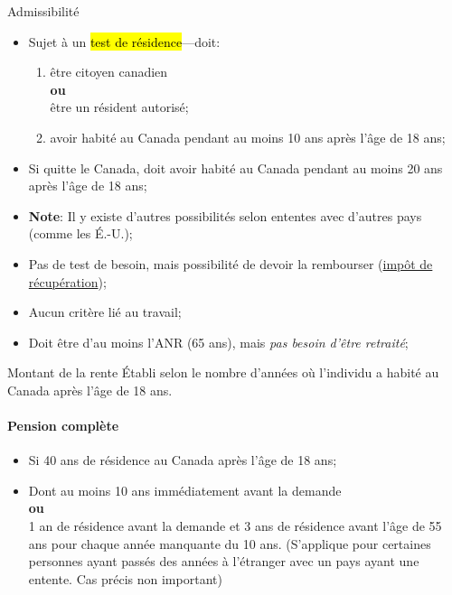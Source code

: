 \documentclass[10pt, french]{article}
\begin{document}
\begin{multicols*}{3}
\begin{conceptgen}{Admissibilité}
\begin{itemize}[leftmargin = *]
	\item	Sujet à un \hl{test de résidence}---doit: 
		\begin{enumerate}[leftmargin = *]
		\item	être citoyen canadien \\
					\textbf{ou}\\
				être un résident autorisé;
		\item	avoir habité au Canada pendant au moins 10 ans après l'âge de 18 ans;
		\end{enumerate}
	\item	Si quitte le Canada, doit avoir habité au Canada pendant au moins 20 ans après l'âge de 18 ans;
	\item[]	\textbf{Note}: Il y existe d'autres possibilités selon ententes avec d'autres pays (comme les É.-U.);
	\item	Pas de test de besoin, mais possibilité de devoir la rembourser (\hypertarget{recup_tx_l8r1}{\hyperlink{recup_tx_explain}{\textcolor{blue_rectangle}{impôt de récupération}}});
	\item   Aucun critère lié au travail;
	\item	Doit être d'au moins l'ANR (65 ans), mais \textit{pas besoin d'être retraité};
\end{itemize}
\end{conceptgen}

\begin{conceptgen}{Montant de la rente}
Établi selon le nombre d'années où l'individu a habité au Canada après l'âge de 18 ans.

\paragraph*{Pension complète}
\begin{itemize}[leftmargin = *]
	\item	Si 40 ans de résidence au Canada après l'âge de 18 ans;
	\item	Dont au moins 10 ans immédiatement avant la demande \\
				\textbf{ou} 	\\
			1 an de résidence avant la demande et 3 ans de résidence avant l'âge de 55 ans pour chaque année manquante du 10 ans. \textcolor{burntorange}{(S'applique pour certaines personnes ayant passés des années à l'étranger avec un pays ayant une entente. Cas précis non important)}
\end{itemize}


\end{conceptgen}
\end{multicols*}
\end{document}
